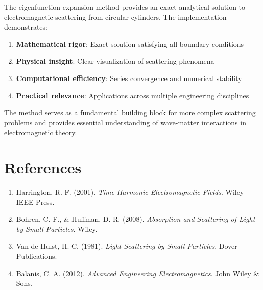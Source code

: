 \documentclass[11pt,a4paper]{article}
\begin{document}
The eigenfunction expansion method provides an exact analytical solution to electromagnetic scattering from circular cylinders. The implementation demonstrates:

\begin{enumerate}
\item \textbf{Mathematical rigor}: Exact solution satisfying all boundary conditions
\item \textbf{Physical insight}: Clear visualization of scattering phenomena
\item \textbf{Computational efficiency}: Series convergence and numerical stability
\item \textbf{Practical relevance}: Applications across multiple engineering disciplines
\end{enumerate}

The method serves as a fundamental building block for more complex scattering problems and provides essential understanding of wave-matter interactions in electromagnetic theory.

\section{References}

\begin{enumerate}
\item Harrington, R. F. (2001). \textit{Time-Harmonic Electromagnetic Fields}. Wiley-IEEE Press.
\item Bohren, C. F., \& Huffman, D. R. (2008). \textit{Absorption and Scattering of Light by Small Particles}. Wiley.
\item Van de Hulst, H. C. (1981). \textit{Light Scattering by Small Particles}. Dover Publications.
\item Balanis, C. A. (2012). \textit{Advanced Engineering Electromagnetics}. John Wiley \& Sons.
\end{enumerate}
\end{document}
